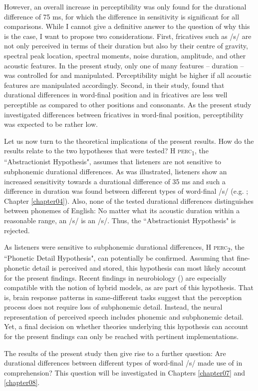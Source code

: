 However, an overall increase in perceptibility was only found for the durational difference of 75 ms, for which the difference in sensitivity is significant for all comparisons. While I cannot give a definitive answer to the question of why this is the case, I want to propose two considerations. First, fricatives such as /s/ are not only perceived in terms of their duration but also by their centre of gravity, spectral peak location, spectral moments, noise duration, amplitude, and other acoustic features. In the present study, only one of many features – duration – was controlled for and manipulated. Perceptibility might be higher if all acoustic features are manipulated accordingly. Second, in their study, \citet{Klatt1975} found that durational differences in word-final position and in fricatives are less well perceptible as compared to other positions and consonants. As the present study investigated differences between fricatives in word-final position, perceptibility was expected to be rather low.

Let us now turn to the theoretical implications of the present results. How do the results relate to the two hypotheses that were tested? \textsc{H perc\textsubscript{1}}, the ``Abstractionist Hypothesis", assumes that listeners are not sensitive to subphonemic durational differences. As was illustrated, listeners show an increased sensitivity towards a durational difference of 35 ms and such a difference in duration was found between different types of word-final /s/ (e.g. \cite{Plag2017}; Chapter \ref{chapter04}). Also, none of the tested durational differences distinguishes between phonemes of English: No matter what its acoustic duration within a reasonable range, an /s/ is an /s/. Thus, the ``Abstractionist Hypothesis" is rejected.

As listeners were sensitive to subphonemic durational differences, \textsc{H perc\textsubscript{2}}, the ``Phonetic Detail Hypothesis", can potentially be confirmed. Assuming that fine-phonetic detail is perceived and stored, this hypothesis can most likely account for the present findings. Recent findings in neurobiology (\cite{Beach2021}) are especially compatible with the notion of hybrid models, as are part of this hypothesis. That is, brain response patterns in same-different tasks suggest that the perception process does not require loss of subphonemic detail. Instead, the neural representation of perceived speech includes phonemic and subphonemic detail. Yet, a final decision on whether theories underlying this hypothesis can account for the present findings can only be reached with pertinent implementations.

The results of the present study then give rise to a further question: Are durational differences between different types of word-final /s/ made use of in comprehension? This question will be investigated in Chapters \ref{chapter07} and \ref{chapter08}.
